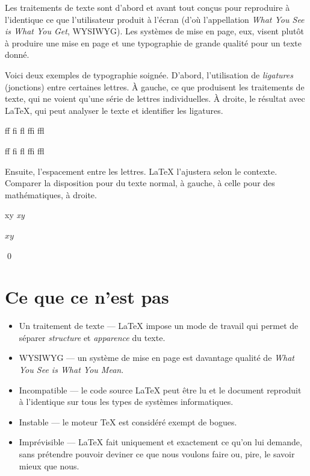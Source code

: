 \begin{exemple}
  Les traitements de texte sont d'abord et avant tout conçus pour
  reproduire à l'identique ce que l'utilisateur produit à l'écran
  (d'où l'appellation \emph{What You See is What You Get}, WYSIWYG).
  Les systèmes de mise en page, eux, visent plutôt à produire une mise
  en page et une typographie de grande qualité pour un texte donné.

  Voici deux exemples de typographie soignée. D'abord, l'utilisation
  de \emph{ligatures} (jonctions) entre certaines lettres. À gauche,
  ce que produisent les traitements de texte, qui ne voient qu'une
  série de lettres individuelles. À droite, le résultat avec {\LaTeX},
  qui peut analyser le texte et identifier les ligatures.
  \begin{demo}
    \centering
    \begin{minipage}{0.3\linewidth}
      \rmfamily f\/f \quad f\/i \quad f\/l \quad f\/f\/i \quad
      f\/f\/l
    \end{minipage}
    \qquad
    \begin{minipage}{0.3\linewidth}
      \rmfamily ff \quad fi \quad fl \quad ffi \quad ffl
    \end{minipage}
  \end{demo}

  Ensuite, l'espacement entre les lettres. {\LaTeX} l'ajustera selon
  le contexte. Comparer la disposition pour du texte normal, à gauche,
  à celle pour des mathématiques, à droite.
  \begin{demo}
    \centering
    \begin{minipage}{0.3\linewidth}
      \rmfamily xy \quad \emph{xy}
    \end{minipage}
    \qquad
    \begin{minipage}{0.3\linewidth}
      $xy$
    \end{minipage}
  \end{demo}
  \qed
\end{exemple}


\section{Ce que ce n'est pas}
\label{sec:presentation:n-est-pas}

\begin{itemize}
\item Un traitement de texte --- {\LaTeX} impose un mode de travail
  qui permet de séparer \emph{structure} et \emph{apparence} du texte.
\item WYSIWYG --- un système de mise en page est davantage qualité de
  \emph{What You See is What You Mean}.
\item Incompatible --- le code source {\LaTeX} peut être lu et le
  document reproduit à l'identique sur tous les types de systèmes
  informatiques.
\item Instable --- le moteur {\TeX} est considéré exempt de bogues.
\item Imprévisible --- {\LaTeX} fait uniquement et exactement ce qu'on
  lui demande, sans prétendre pouvoir deviner ce que nous voulons
  faire ou, pire, le savoir mieux que nous.
\end{itemize}


